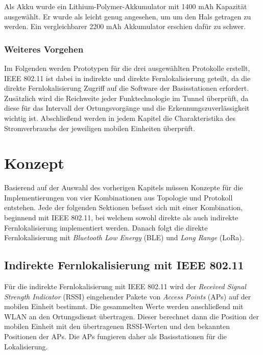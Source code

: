 Als Akku wurde ein Lithium-Polymer-Akkumulator mit 1400 mAh Kapazität ausgewählt.
Er wurde als leicht genug angesehen, um um den Hals getragen zu werden. 
Ein vergleichbarer 2200 mAh Akkumulator erschien dafür zu schwer.


\subsection{Weiteres Vorgehen}
Im Folgenden werden Prototypen für die drei ausgewählten Protokolle erstellt, IEEE 802.11 ist dabei in indirekte und direkte Fernlokalisierung geteilt, da die direkte Fernlokalisierung Zugriff auf die Software der Basisstationen erfordert.
Zusätzlich wird die Reichweite jeder Funktechnologie im Tunnel überprüft, da diese für das Intervall der Ortungsvorgänge und die Erkennungszuverlässigkeit wichtig ist.
Abschließend werden in jedem Kapitel die Charakteristika des Stromverbrauchs der jeweiligen mobilen Einheiten überprüft.









\chapter{Konzept}
\label{ch:Konzept}
Basierend auf der Auswahl des vorherigen Kapitels müssen Konzepte für die Implementierungen von vier Kombinationen aus Topologie und Protokoll entstehen.
Jede der folgenden Sektionen befasst sich mit einer Kombination, beginnend mit IEEE 802.11, bei welchem sowohl direkte als auch indirekte Fernlokalisierung implementiert werden.
Danach folgt die direkte Fernlokalisierung mit \emph{Bluetooth Low Energy} (BLE) und \emph{Long Range} (LoRa).

\section{Indirekte Fernlokalisierung mit IEEE 802.11}
Für die indirekte Fernlokalisierung mit IEEE 802.11 wird der \emph{Received Signal Strength Indicator} (RSSI) eingehender Pakete von \emph{Access Points} (APs) auf der mobilen Einheit bestimmt.
Die gesammelten Werte werden anschließend mit WLAN an den Ortungsdienst übertragen.
Dieser berechnet dann die Position der mobilen Einheit mit den übertragenen RSSI-Werten und den bekannten Positionen der APs.
Die APs fungieren daher als Basisstationen für die Lokalisierung.

